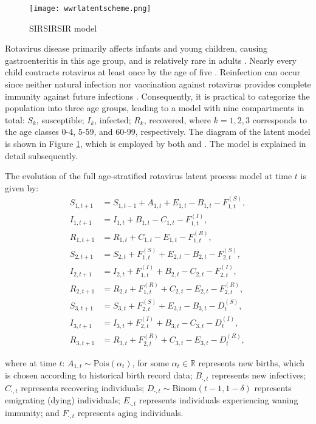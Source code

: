 \documentclass[10pt]{article}
\begin{document}
\begin{figure}[h]
\centering
\texttt{[image: wwrlatentscheme.png]}
\caption{\label{fig:SIRSIRSIR model}SIRSIRSIR model \citep{wwr}}
\end{figure}

Rotavirus disease primarily affects infants and young children, causing gastroenteritis in this age group, and is relatively rare in adults \citep{Lambert2009-it}. Nearly every child contracts rotavirus at least once by the age of five \citep{CDC}. Reinfection can occur since neither natural infection nor vaccination against rotavirus provides complete immunity against future infections \citep{stocks}. Consequently, it is practical to categorize the population into three age groups, leading to a model with nine compartments in total: $S_k$, susceptible; $I_k$, infected; $R_k$, recovered, where $k=1,2,3$ corresponds to the age classes 0-4, 5-59, and 60-99, respectively. The diagram of the latent model is shown in Figure \ref{fig:SIRSIRSIR model}, which is employed by both \cite{wwr} and \cite{stocks}. The model is explained in detail subsequently.

The evolution of the full age-stratified rotavirus latent process model at time $t$ is given by:
\begin{align*}
    S_{1,t+1} &= S_{1,t-1} + A_{1,t} + E_{1,t} - B_{1,t} - F^{(S)}_{1,t}, \\
    I_{1,t+1} &= I_{1,t} + B_{1,t} - C_{1,t} - F^{(I)}_{1,t}, \\
    R_{1,t+1} &= R_{1,t} + C_{1,t} - E_{1,t} - F^{(R)}_{1,t}, \\
    S_{2,t+1} &= S_{2,t} + F^{(S)}_{1,t} + E_{2,t} - B_{2,t} - F^{(S)}_{2,t}, \\
    I_{2,t+1} &= I_{2,t} + F^{(I)}_{1,t} + B_{2,t} - C_{2,t} - F^{(I)}_{2,t}, \\
    R_{2,t+1} &= R_{2,t} + F^{(R)}_{1,t} + C_{2,t} - E_{2,t} - F^{(R)}_{2,t}, \\
    S_{3,t+1} &= S_{3,t} + F^{(S)}_{2,t} + E_{3,t} - B_{3,t} - D^{(S)}_{t}, \\
    I_{3,t+1} &= I_{3,t} + F^{(I)}_{2,t} + B_{3,t} - C_{3,t} - D^{(I)}_{t}, \\
    R_{3,t+1} &= R_{3,t} + F^{(R)}_{2,t} + C_{3,t} - E_{3,t} - D^{(R)}_{t},
\end{align*}

where at time $t$: $A_{1,t} \sim \text{Pois}(\alpha_t)$, for some $\alpha_t \in \mathbb{R}$ represents new births, which is chosen according to historical birth record data; $B_{\cdot,t}$ represents new infectives; $C_{\cdot,t}$ represents recovering individuals; $D_{\cdot,t} \sim \text{Binom}(t-1, 1-\delta)$ represents emigrating (dying) individuals; $E_{\cdot,t}$ represents individuals experiencing waning immunity; and $F_{\cdot,t}$ represents aging individuals.
\end{document}
